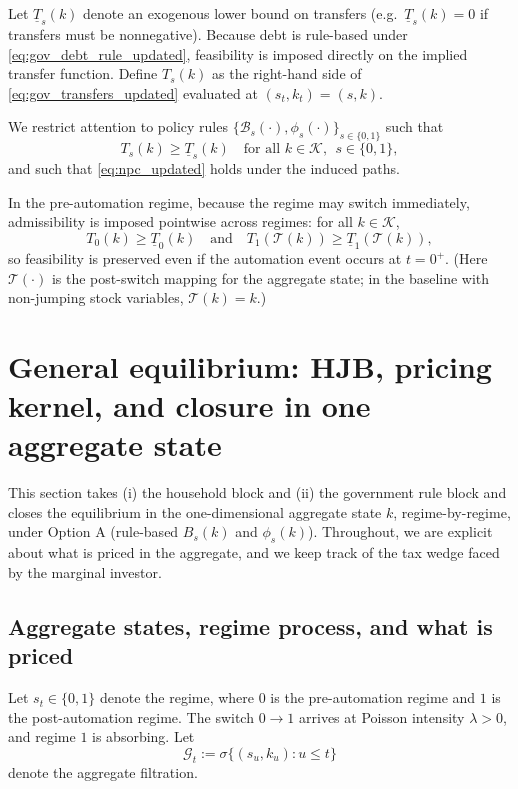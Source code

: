 \documentclass{article}
\begin{document}
Let $\underline T_s(k)$ denote an exogenous lower bound on transfers (e.g.\ $\underline T_s(k)=0$ if transfers must be nonnegative).
Because debt is rule-based under \eqref{eq:gov_debt_rule_updated}, feasibility is imposed directly on the implied transfer function.
Define $T_s(k)$ as the right-hand side of \eqref{eq:gov_transfers_updated} evaluated at $(s_t,k_t)=(s,k)$.

We restrict attention to policy rules $\{\mathcal B_s(\cdot),\phi_s(\cdot)\}_{s\in\{0,1\}}$ such that
\begin{equation}\label{eq:transfer_feasibility_updated}
T_s(k)\ge \underline T_s(k)\quad\text{for all }k\in\mathcal K,\ \ s\in\{0,1\},
\end{equation}
and such that \eqref{eq:npc_updated} holds under the induced paths.

In the pre-automation regime, because the regime may switch immediately, admissibility is imposed pointwise across regimes:
for all $k\in\mathcal K$,
\begin{equation}\label{eq:pre_admissibility_updated}
T_0(k)\ge \underline T_0(k)
\quad\text{and}\quad
T_1(\mathcal T(k))\ge \underline T_1(\mathcal T(k)),
\end{equation}
so feasibility is preserved even if the automation event occurs at $t=0^+$.
(Here $\mathcal T(\cdot)$ is the post-switch mapping for the aggregate state; in the baseline with non-jumping stock variables, $\mathcal T(k)=k$.)

\section{General equilibrium: HJB, pricing kernel, and closure in one aggregate state}
This section takes (i) the household block and (ii) the government rule block and closes the equilibrium in the one-dimensional aggregate state $k$, regime-by-regime, under Option A (rule-based $B_s(k)$ and $\phi_s(k)$). Throughout, we are explicit about what is priced in the aggregate, and we keep track of the tax wedge faced by the marginal investor.

\subsection{Aggregate states, regime process, and what is priced}
Let $s_t \in \{0,1\}$ denote the regime, where $0$ is the pre-automation regime and $1$ is the post-automation regime. The switch $0 \to 1$ arrives at Poisson intensity $\lambda>0$, and regime $1$ is absorbing. Let
\[
\mathcal{G}_t := \sigma\{(s_u,k_u): u \le t\}
\]
denote the aggregate filtration.
\end{document}
